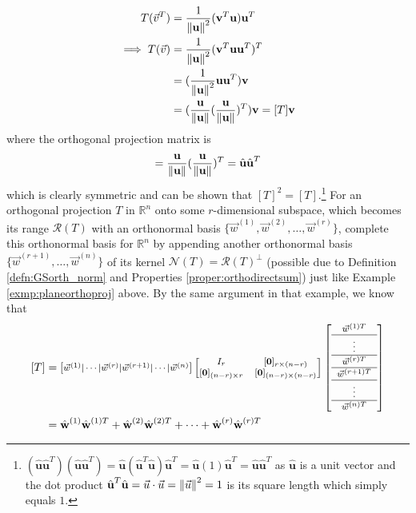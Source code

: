 \begin{align*}
T(\vec{v}^T) &= \frac{1}{\norm{\textbf{u}}^2}(\textbf{v}^T\textbf{u})\textbf{u}^T \\
\implies T(\vec{v}) &= \frac{1}{\norm{\textbf{u}}^2}(\textbf{v}^T\textbf{u}\textbf{u}^T)^T \\
&= (\frac{1}{\norm{\textbf{u}}^2}\textbf{u}\textbf{u}^T)\textbf{v} \\
&= (\frac{\textbf{u}}{\norm{\textbf{u}}}(\frac{\textbf{u}}{\norm{\textbf{u}}})^T)\textbf{v} = [T]\textbf{v}
\end{align*}
where the orthogonal projection matrix is 
\begin{align}
[T] = \frac{\textbf{u}}{\norm{\textbf{u}}}(\frac{\textbf{u}}{\norm{\textbf{u}}})^T = \hat{\textbf{u}}\hat{\textbf{u}}^T    
\end{align} which is clearly symmetric and can be shown that $[T]^2 = [T]$.\footnote{$(\hat{\textbf{u}}\hat{\textbf{u}}^T)(\hat{\textbf{u}}\hat{\textbf{u}}^T) = \hat{\textbf{u}}(\hat{\textbf{u}}^T\hat{\textbf{u}})\hat{\textbf{u}}^T = \hat{\textbf{u}}(1)\hat{\textbf{u}}^T = \hat{\textbf{u}}\hat{\textbf{u}}^T$ as $\hat{\textbf{u}}$ is a unit vector and the dot product $\hat{\textbf{u}}^T\hat{\textbf{u}} = \vec{u}\cdot\vec{u} = \norm{\vec{u}}^2 = 1$ is its square length which simply equals $1$.} For an orthogonal projection $T$ in $\mathbb{R}^n$ onto some $r$-dimensional subspace, which becomes its range $\mathcal{R}(T)$ with an orthonormal basis $\{\vec{w}^{(1)}, \vec{w}^{(2)}, \ldots, \vec{w}^{(r)}\}$, complete this orthonormal basis for $\mathbb{R}^n$ by appending another orthonormal basis $\{\vec{w}^{(r+1)}, \ldots, \vec{w}^{(n)}\}$ of its kernel $\mathcal{N}(T) = \mathcal{R}(T)^\perp$ (possible due to Definition \ref{defn:GSorth_norm} and Properties \ref{proper:orthodirectsum}) just like Example \ref{exmp:planeorthoproj} above. By the same argument in that example, we know that
\begin{subequations}
\begin{align}
[T] &= 
\footnotesize
\begin{bmatrix}
\vec{w}^{(1)}|\cdots|\vec{w}^{(r)}|\vec{w}^{(r+1)}|\cdots|\vec{w}^{(n)}
\end{bmatrix}
\begin{bmatrix}
I_r & [\textbf{0}]_{r\times(n-r)} \\
[\textbf{0}]_{(n-r)\times r} & [\textbf{0}]_{(n-r)\times(n-r)} \\
\end{bmatrix}
\left[\begin{array}{c} 
\vec{w}^{(1)T} \\
\hline
\vdots \\
\hline
\vec{w}^{(r)T} \Tstrut \\
\hline
\vec{w}^{(r+1)T} \Tstrut\\
\hline 
\vdots \\
\hline
\vec{w}^{(n)T} \Tstrut
\end{array}\right] \\
&= \hat{\textbf{w}}^{(1)}\hat{\textbf{w}}^{(1)T} + \hat{\textbf{w}}^{(2)}\hat{\textbf{w}}^{(2)T} + \cdots + \hat{\textbf{w}}^{(r)}\hat{\textbf{w}}^{(r)T} \label{eqn:projrank1sum}
\end{align}
\end{subequations}
